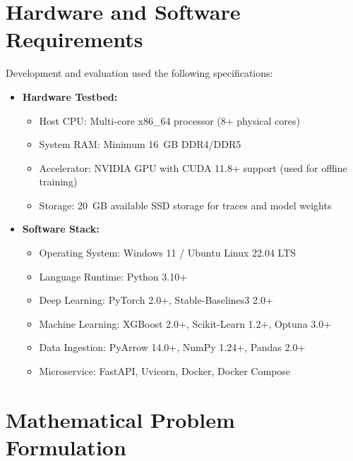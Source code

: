 \documentclass[12pt]{report}
\begin{document}
\section{Hardware and Software Requirements}

Development and evaluation used the following specifications:
\begin{itemize}
\item \textbf{Hardware Testbed:}
  \begin{itemize}
  \item Host CPU: Multi-core x86\_64 processor (8+ physical cores)
  \item System RAM: Minimum 16~GB DDR4/DDR5
  \item Accelerator: NVIDIA GPU with CUDA 11.8+ support (used for offline training)
  \item Storage: 20~GB available SSD storage for traces and model weights
  \end{itemize}
\item \textbf{Software Stack:}
  \begin{itemize}
  \item Operating System: Windows 11 / Ubuntu Linux 22.04 LTS
  \item Language Runtime: Python 3.10+
  \item Deep Learning: PyTorch 2.0+, Stable-Baselines3 2.0+
  \item Machine Learning: XGBoost 2.0+, Scikit-Learn 1.2+, Optuna 3.0+
  \item Data Ingestion: PyArrow 14.0+, NumPy 1.24+, Pandas 2.0+
  \item Microservice: FastAPI, Uvicorn, Docker, Docker Compose
  \end{itemize}
\end{itemize}

\section{Mathematical Problem Formulation}
\end{document}
